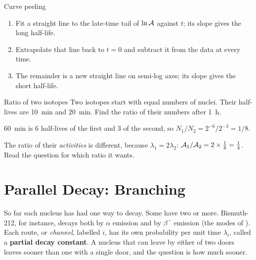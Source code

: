 \begin{methodbox}{Curve peeling}
\begin{enumerate}[label=\arabic*.,leftmargin=*,itemsep=1pt]
\item Fit a straight line to the late-time tail of $\ln\mathcal{A}$ against $t$; its slope gives the long
half-life.
\item Extrapolate that line back to $t=0$ and subtract it from the data at every time.
\item The remainder is a new straight line on semi-log axes; its slope gives the short half-life.
\end{enumerate}
\end{methodbox}

\begin{figure}[htbp]
\centering
{}
\end{figure}

\begin{exbox}{Ratio of two isotopes}
Two isotopes start with equal numbers of nuclei. Their half-lives are \SI{10}{min} and \SI{20}{min}.
Find the ratio of their numbers after \SI{1}{h}.

 \SI{60}{min} is $6$ half-lives of the first and $3$ of the second, so
$N_1/N_2=2^{-6}/2^{-3}=1/8$.

 The ratio of their \emph{activities} is different, because $\lambda_1=2\lambda_2$:
$\mathcal{A}_1/\mathcal{A}_2=2\times\tfrac18=\tfrac14$. Read the question for which ratio it wants.
\end{exbox}

\section{Parallel Decay: Branching}\label{sec:decaylaw-branching}

So far each nucleus has had one way to decay. Some have two or more. Bismuth-212, for instance, decays
both by $\alpha$ emission and by $\beta^-$ emission (the modes of ). Each route, or
\emph{channel}, labelled $i$, has its own probability per unit time $\lambda_i$, called a \textbf{partial
decay constant}. A nucleus that can leave by either of two doors leaves sooner than one with a single
door, and the question is how much sooner.


